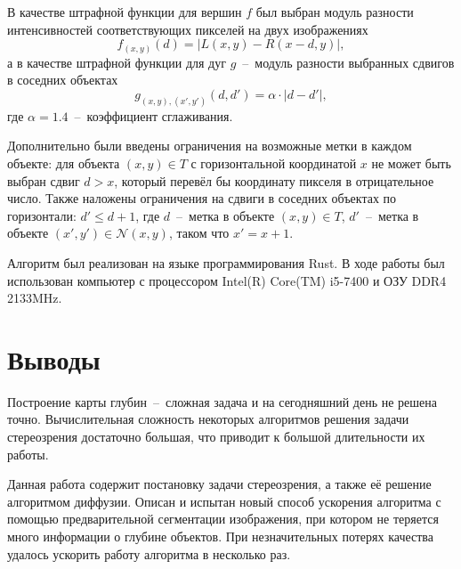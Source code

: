 \documentclass{ConfFTI}
\begin{document}
В качестве штрафной функции для вершин $f$ был выбран
модуль разности интенсивностей соответствующих пикселей на двух изображениях
\begin{equation*}
    f_{\left(x, y \right)} \left(d \right) =
    \left| L \left(x, y \right) - R \left( x - d, y \right) \right|,
\end{equation*}
а в качестве штрафной функции для дуг
$g$~--~модуль разности выбранных сдвигов в соседних объектах
\begin{equation*}
    g_{\left(x, y \right), \left(x', y' \right)} \left(d, d' \right) =
    \alpha \cdot \left| d - d' \right|,
\end{equation*}
где $\alpha = 1.4$~--~коэффициент сглаживания.

Дополнительно были введены ограничения на возможные метки в каждом объекте:
для объекта $\left(x, y \right) \in T$ с горизонтальной координатой $x$
не может быть выбран сдвиг $d > x$,
который перевёл бы координату пикселя в отрицательное число.
Также наложены ограничения на сдвиги в соседних объектах по горизонтали:
$d' \le d + 1$, где $d$~--~метка в объекте $\left(x, y \right) \in T$,
$d'$~--~метка в объекте $\left(x', y'\right) \in \mathcal{N}\left(x, y \right)$,
таком что $x' = x + 1$.

Алгоритм был реализован на языке программирования Rust.
В ходе работы был использован компьютер с процессором Intel(R) Core(TM) i5-7400
и ОЗУ DDR4 2133MHz.

\section*{Выводы}
Построение карты глубин~--~сложная задача и
на сегодняшний день не решена точно.
Вычислительная сложность некоторых алгоритмов решения задачи стереозрения
достаточно большая,
что приводит к большой длительности их работы.

Данная работа содержит постановку задачи стереозрения,
а также её решение алгоритмом диффузии.
Описан и испытан новый способ ускорения алгоритма с помощью
предварительной сегментации изображения,
при котором не теряется много информации о глубине объектов.
При незначительных потерях качества удалось ускорить работу алгоритма
в несколько раз.



\end{document}
